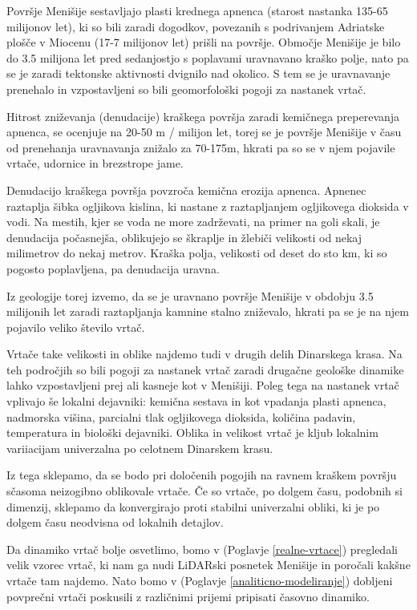 \documentclass[a4paper, twoside, 12pt]{book}
\begin{document}
  Površje Menišije sestavljajo plasti krednega apnenca (starost nastanka 135-65 milijonov let), ki so bili zaradi dogodkov, povezanih s podrivanjem Adriatske plošče v Miocenu (17-7 milijonov let) prišli na površje. Območje Menišije je bilo do 3.5 milijona let pred sedanjostjo s poplavami uravnavano kraško polje, nato pa se je zaradi tektonske aktivnosti dvignilo nad okolico. S tem se je uravnavanje prenehalo in vzpostavljeni so bili geomorfološki pogoji za nastanek vrtač.

Hitrost zniževanja (denudacije) kraškega površja zaradi kemičnega preperevanja apnenca, se ocenjuje na 20-50 m / milijon let, torej se je površje Menišije v času od prenehanja uravnavanja znižalo za 70-175m, hkrati pa so se v njem pojavile vrtače, udornice in brezstrope jame. \cite{Vrabec2006} \cite{Placer2010}

Denudacijo kraškega površja povzroča kemična erozija apnenca. Apnenec raztaplja šibka ogljikova kislina, ki nastane z raztapljanjem ogljikovega dioksida v vodi. Na mestih, kjer se voda ne more zadrževati, na primer na goli skali, je denudacija počasnejša, oblikujejo se škraplje in žlebiči velikosti od nekaj milimetrov do nekaj metrov. Kraška polja, velikosti od deset do sto km, ki so pogosto poplavljena, pa denudacija uravna.

Iz geologije torej izvemo, da se je uravnano površje Menišije v obdobju 3.5 milijonih let zaradi raztapljanja kamnine stalno zniževalo, hkrati pa se je na njem pojavilo veliko število vrtač.

Vrtače take velikosti in oblike najdemo tudi v drugih delih Dinarskega krasa. Na teh področjih so bili pogoji za nastanek vrtač zaradi drugačne geološke dinamike lahko vzpostavljeni prej ali kasneje kot v Menišiji. Poleg tega na nastanek vrtač vplivajo še lokalni dejavniki: kemična sestava in kot vpadanja plasti apnenca, nadmorska višina, parcialni tlak ogljikovega dioksida, količina padavin, temperatura in biološki dejavniki. Oblika in velikost vrtač je kljub lokalnim variiacijam univerzalna po celotnem Dinarskem krasu.

Iz tega sklepamo, da se bodo pri določenih pogojih na ravnem kraškem površju sčasoma neizogibno oblikovale vrtače. Če so vrtače, po dolgem času, podobnih si dimenzij, sklepamo da konvergirajo proti stabilni univerzalni obliki, ki je po dolgem času neodvisna od lokalnih detajlov.

Da dinamiko vrtač bolje osvetlimo, bomo v (Poglavje \ref{realne-vrtace}) pregledali velik vzorec vrtač, ki nam ga nudi LiDARski posnetek Menišije in poročali kakšne vrtače tam najdemo. Nato bomo v (Poglavje \ref{analiticno-modeliranje}) dobljeni povprečni vrtači poskusili z različnimi prijemi pripisati časovno dinamiko.
\end{document}
